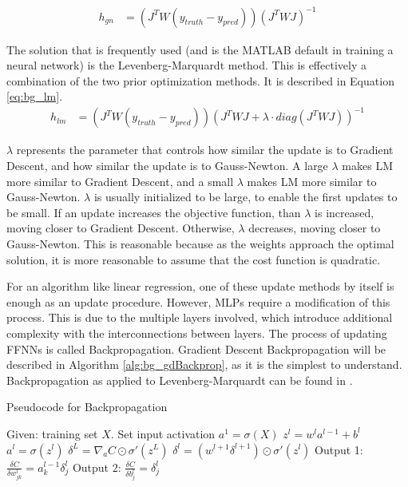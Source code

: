 	\begin{align}
		h_{gn} &= (J^TW(y_{truth}-y_{pred}))(J^T WJ)^{-1} \label{eq:bg_gaussNewton}
	\end{align}
	\par The solution that is frequently used (and is the MATLAB default in training a neural network) is the Levenberg-Marquardt method. This is effectively a combination of the two prior optimization methods. It is described in Equation \ref{eq:bg_lm}. 
	\begin{align}
		h_{lm} &= (J^TW(y_{truth}-y_{pred}))(J^T WJ + \lambda \cdot diag(J^T WJ))^{-1} \label{eq:bg_lm}
	\end{align}
	\par $\lambda$ represents the parameter that controls how similar the update is to Gradient Descent, and how similar the update is to Gauss-Newton. A large $\lambda$ makes LM more similar to Gradient Descent, and a small $\lambda$ makes LM more similar to Gauss-Newton. $\lambda$ is usually initialized to be large, to enable the first updates to be small. If an update increases the objective function, than $\lambda$ is increased, moving closer to Gradient Descent. Otherwise, $\lambda$ decreases, moving closer to Gauss-Newton. This is reasonable because as the weights approach the optimal solution, it is more reasonable to assume that the cost function is quadratic.
	\par For an algorithm like linear regression, one of these update methods by itself is enough as an update procedure. However, MLPs require a modification of this process. This is due to the multiple layers involved, which introduce additional complexity with the interconnections between layers. The process of updating FFNNs is called Backpropagation. Gradient Descent Backpropagation will be described in Algorithm \ref{alg:bg_gdBackprop}, as it is the simplest to understand. Backpropagation as applied to Levenberg-Marquardt can be found in \cite{lm-backprop}.
	\begin{algorithm}
		\caption{Pseudocode for Backpropagation}
		\label{alg:bg_gdBackprop}
		\begin{algorithmic}[1]
			\State Given: training set $X$.
			\State Set input activation $a^1=\sigma(X)$
			\State $z^l = w^l a^{l-1} +b^l$
			\State $a^l = \sigma(z^l)$ 
			\EndFor
			\State $\delta^L = \nabla_a C \odot \sigma '(z^L)$
			\State $\delta^l = (w^{l+1}\delta^{l+1}) \odot \sigma '(z^l)$
			\EndFor
			\State Output 1: $\frac{\delta C}{\delta w^{l}_{jk}} = a^{l-1}_{k}\delta^{l}_{j}$
			\State Output 2: $\frac{\delta C}{\delta b^{l}_{j}} = \delta^{l}_{j}$
			\EndProcedure
		\end{algorithmic}
	\end{algorithm}
